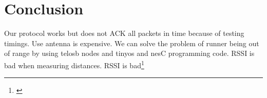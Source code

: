 \section{Conclusion}\label{ch:conclusion}

Our protocol works but does not ACK all packets in time because of testing timings.
Use antenna is expensive.
We can solve the problem of runner being out of range by using telosb nodes and tinyos and nesC programming code.
RSSI is bad when measuring distances.
RSSI is bad\footnote{\cite{Heurtefeux2012}}